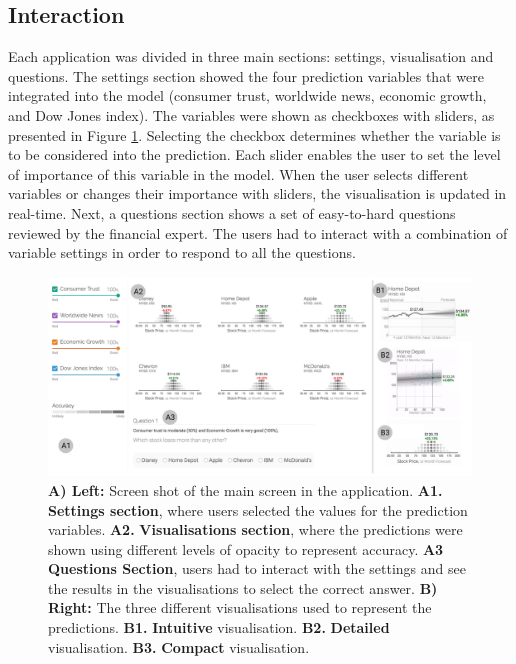 \documentclass[final,5p,times,twocolumn,authoryear]{elsarticle}
\begin{document}
\subsection{Interaction}
Each application was divided in three main sections: settings, visualisation and questions. The settings section showed the four prediction variables that were integrated into the model (consumer trust,  worldwide news, economic growth, and Dow Jones index). The variables were shown as checkboxes with sliders, as presented in Figure \ref{whole_app2}. Selecting the checkbox determines whether the variable is to be considered into the prediction. Each slider enables the user to set the level of importance of this variable in the model. When the user selects different variables or changes their importance with sliders, the visualisation is updated in real-time. Next, a questions section shows a set of easy-to-hard questions reviewed by the financial expert. The users had to interact with a combination of variable settings in order to respond to all the questions.

\begin{figure}
\includegraphics[width=\textwidth]{figures/whole_app2.png}
\caption{\textbf{A) Left:} Screen shot of the main screen in the application. \textbf{A1.} \textbf{Settings section}, where users selected the values for the prediction variables. \textbf{A2.} \textbf{Visualisations section}, where the predictions were shown using different levels of opacity to represent accuracy. \textbf{A3} \textbf{Questions Section}, users had to interact with the settings and see the results in the visualisations to select the correct answer. \textbf{B) Right:} The three different visualisations used to represent the predictions. \textbf{B1.} \textbf{Intuitive} visualisation. \textbf{B2.} \textbf{Detailed} visualisation. \textbf{B3.} \textbf{Compact} visualisation.}\label{whole_app2}
\end{figure} 
\end{document}
